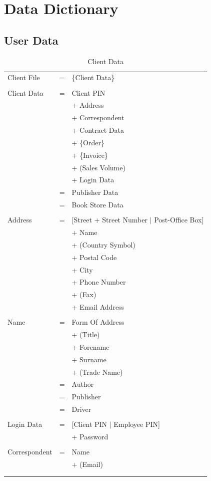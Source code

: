 \documentclass[11pt,a4paper,oneside,svgnames]{report}
\begin{document}
\chapter{Data Dictionary}

\section{User Data}

\begin{longtable}{p{3.5cm}p{0.5cm}p{8.5cm}}
Client File & = & \{Client Data\} \\
\\
Client Data & = & Client PIN\\
&  & + Address\\
&  & + Correspondent\\
&  & + Contract Data\\
&  & + \{Order\}\\
&  & + \{Invoice\}\\
&  & + (Sales Volume)\\
&  & + Login Data \\
& = & Publisher Data\\
& = & Book Store Data\\
\\
Address & = & [Street + Street Number $|$ Post-Office Box]\\
&  & + Name\\
&  & +  (Country Symbol)\\
&  & +  Postal Code\\
&  & + City\\
&  & + Phone Number\\
&  & + (Fax)\\
&  & + Email Address\\
\\
Name & = & Form Of Address\\
&  & + (Title)\\
&  & + Forename\\
&  & + Surname\\
&  & + (Trade Name)\\
& = & Author\\
& = & Publisher\\
& = & Driver\\
\\
Login Data & = & [Client PIN $|$ Employee PIN]\\
&  & + Password \\
\\
Correspondent & = & Name\\
&  & + (Email)\\
\hfill\\
\caption{Client Data}\\
\end{longtable}
\end{document}
